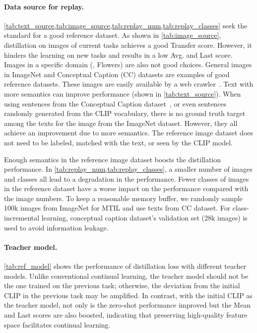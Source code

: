 \paragraph{Data source for replay.} \cref{tab:text_source,tab:image_source,tab:replay_num,tab:replay_classes} seek the standard for a good reference dataset. As shown in \cref{tab:image_source}, distillation on images of current tasks achieves a good Transfer score. However, it hinders the learning on new tasks and results in a low Avg. and Last score. Images in a specific domain (\eg, Flowers) are also not good choices. General images in ImageNet and Conceptual Caption (CC) datasets are examples of good reference datasets. These images are easily available by a web crawler~\cite{thomee2016yfcc100m}. Text with more semantics can improve performance (shown in \cref{tab:text_source}). When using sentences from the Conceptual Caption dataset~\cite{sharma2018conceptual}, or even sentences randomly generated from the CLIP vocabulary, there is no ground truth target among the texts for the image from the ImageNet dataset. However, they all achieve an improvement due to more semantics. The reference image dataset does not need to be labeled, matched with the text, or seen by the CLIP model. 

Enough semantics in the reference image dataset boosts the distillation performance. In \cref{tab:replay_num,tab:replay_classes}, a smaller number of images and classes all lead to a degradation in the performance. Fewer classes of images in the reference dataset have a worse impact on the performance compared with the image numbers. To keep a reasonable memory buffer, we randomly sample 100k images from ImageNet for MTIL and use texts from CC dataset. For class-incremental learning, conceptual caption dataset's validation set (28k images) is used to avoid information leakage.

\paragraph{Teacher model.} \cref{tab:ref_model} shows the performance of distillation loss with different teacher models. Unlike conventional continual learning, the teacher model should not be the one trained on the previous task; otherwise, the deviation from the initial CLIP in the previous task may be amplified. In contrast, with the initial CLIP as the teacher model, not only is the zero-shot performance improved but the Mean and Last scores are also boosted, indicating that preserving high-quality feature space facilitates continual learning.

